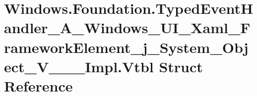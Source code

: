 \hypertarget{struct_windows_1_1_foundation_1_1_typed_event_handler___a___windows___u_i___xaml___framework_ele872ac08da67cec047eb0ef56a7d78c65}{}\section{Windows.\+Foundation.\+Typed\+Event\+Handler\+\_\+\+A\+\_\+\+Windows\+\_\+\+U\+I\+\_\+\+Xaml\+\_\+\+Framework\+Element\+\_\+j\+\_\+\+System\+\_\+\+Object\+\_\+\+V\+\_\+\+\_\+\+\_\+\+Impl.\+Vtbl Struct Reference}
\label{struct_windows_1_1_foundation_1_1_typed_event_handler___a___windows___u_i___xaml___framework_ele872ac08da67cec047eb0ef56a7d78c65}
